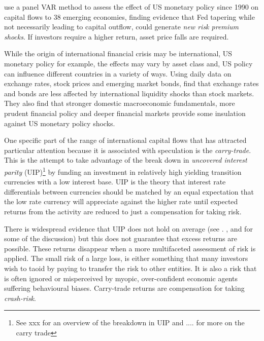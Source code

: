 \documentclass[12pt, a4paper, oneside]{article} %
\begin{document}
\citet{IMFLatam} use a panel VAR method to assess the effect of US monetary policy since 1990 on capital flows to 38 emerging economies, finding evidence that Fed tapering while not necessarily leading to capital outflow, could generate \emph{new risk premium shocks}.   If investors require a higher return, asset price falls are required. 

While the origin of international financial crisis may be international, US monetary policy for example, the effects may vary by asset class and, US policy can influence different countries in a variety of ways.  Using daily data on exchange rates, stock prices and emerging market bonds, \citet{Tapering} find that exchange rates and bonds are less affected by international liquidity shocks than stock markets.  They also find that stronger domestic macroeconomic fundamentals, more prudent financial policy and deeper financial markets provide some insulation against US monetary policy shocks.

One specific part of the range of international capital flows that has attracted particular attention because it is associated with speculation is the \emph{carry-trade}.  This is the attempt to take advantage of the break down in \emph{uncovered interest parity} (UIP)\footnote{See xxx for an overview of the breakdown in UIP and .... for more on the carry trade} by funding an investment in relatively high yielding transition currencies with a low interest base.  UIP is the theory that interest rate differentials between currencies should be matched by an equal expectation that the low rate currency will appreciate against the higher rate until expected returns from the activity are reduced to just a compensation for taking risk. %

There is widespread evidence that UIP does not hold on average (see \citet{FrootAnomolies}. \citet{FrootFrankelFDB}, \citet{Hodrick1987} and \citet{SpronkEER} for some of the discussion) but this does not guarantee that excess returns are possible.  These returns disappear when a more multifaceted assessment of risk is applied.  The small risk of a large loss, is either something that many investors wish to taoid by paying to transfer the risk to other entities.  It is also a risk that is often ignored or misperceived by myopic, over-confident economic agents suffering behavioural biases. Carry-trade returns are compensation for taking \emph{crash-risk}.  
\end{document}
